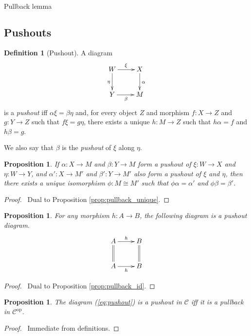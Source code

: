 \documentclass{book}
\let\qed\relax
\newtheorem{prop}[ax]{Proposition}
\theoremstyle{definition}
\newtheorem{df}[ax]{Definition}
\begin{document}
Pullback lemma

\subsection{Pushouts}

\begin{df}[Pushout]
A diagram
\begin{equation}
\label{eq:pushout}
\xymatrix{
W \ar[r]^\xi \ar[d]_\eta & X \ar[d]^\alpha \\
Y \ar[r]_\beta & M
}
\end{equation}
is a \emph{pushout} iff $\alpha \xi = \beta \eta$ and, for every object $Z$ and morphism $f : X \rightarrow Z$ and $g : Y \rightarrow Z$ such that $f \xi = g \eta$, there exists a unique $h : M \rightarrow Z$ such that $h \alpha = f$ and $h \beta = g$.

We also say that $\beta$ is the \emph{pushout} of $\xi$ along $\eta$.
\end{df}

\begin{prop}
If $\alpha : X \rightarrow M$ and $\beta : Y \rightarrow M$ form a pushout of $\xi : W \rightarrow X$ and $\eta : W \rightarrow Y$, and $\alpha' : X \rightarrow M'$ and $\beta' : Y \rightarrow M'$ also form a pushout of $\xi$ and $\eta$, then there exists a unique isomorphism $\phi : M \cong M'$ such that $\phi \alpha = \alpha'$ and $\phi \beta = \beta'$.
\end{prop}

\begin{proof}
\pf\ Dual to Proposition \ref{prop:pullback_unique}. \qed
\end{proof}

\begin{prop}
For any morphism $h : A \rightarrow B$, the following diagram is a pushout diagram.
\[ \xymatrix{
A \ar[r]^h \ar@{=}[d] & B \ar@{=}[d] \\
A \ar[r]_h & B
} \]
\end{prop}

\begin{proof}
\pf\ Dual to Proposition \ref{prop:pullback_id}.
\end{proof}

\begin{prop}
The diagram (\ref{eq:pushout}) is a pushout in $\mathcal{C}$ iff it is a pullback in $\mathcal{C}^\mathrm{op}$.
\end{prop}

\begin{proof}
\pf\ Immediate from definitions. \qed
\end{proof}
\end{document}
